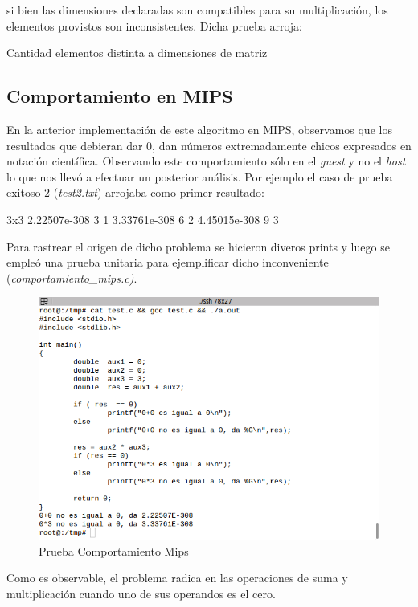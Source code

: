 \documentclass[10pt,a4paper]{article}
\begin{document}
		si bien las dimensiones declaradas son compatibles para su multiplicación, los elementos provistos son inconsistentes. Dicha prueba arroja:

		\begin{bash}
		Cantidad elementos distinta a dimensiones de matriz
		\end{bash}

	\subsection{Comportamiento en MIPS}\label{sec:MIPS}
		En la anterior implementación de este algoritmo en MIPS, observamos que los resultados que debieran dar 0, dan números extremadamente chicos expresados en notación científica. Observando este comportamiento sólo en el \textit{guest} y no el \textit{host} lo que nos llevó a efectuar un posterior análisis. Por ejemplo el caso de prueba exitoso 2 (\textit{test2.txt}) arrojaba como primer resultado:
		\begin{bash}
		3x3 2.22507e-308 3 1 3.33761e-308 6 2 4.45015e-308 9 3
		\end{bash}

		Para rastrear el origen de dicho problema se hicieron diveros prints y luego se empleó una prueba unitaria para ejemplificar dicho inconveniente (\textit{comportamiento\_mips.c)}. 

		\begin{figure}[H]
			\centering
			\includegraphics[scale=0.45]{images/raro.png}\caption{Prueba Comportamiento Mips}
		\end{figure}

		Como es observable, el problema radica en las operaciones de suma y multiplicación cuando uno de sus operandos es el cero. 
\end{document}
